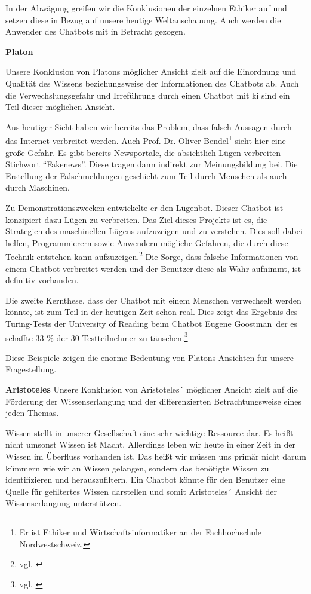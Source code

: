 In der Abwägung greifen wir die Konklusionen der einzelnen Ethiker auf und setzen diese in Bezug auf unsere heutige Weltanschauung. Auch werden die Anwender des Chatbots mit in Betracht gezogen.

\textbf{Platon}

Unsere Konklusion von Platons möglicher Ansicht zielt auf die Einordnung und Qualität des Wissens beziehungsweise der Informationen des Chatbots ab. Auch die Verwechslungsgefahr und Irreführung durch einen Chatbot mit \ac{ki} sind ein Teil dieser möglichen Ansicht.

Aus heutiger Sicht haben wir bereits das Problem, dass falsch Aussagen durch das Internet verbreitet werden. Auch Prof. Dr. Oliver Bendel\footnote{Er ist Ethiker und Wirtschaftsinformatiker an der Fachhochschule Nordwestschweiz.} sieht hier eine große Gefahr. 
Es gibt bereits Newsportale, die absichtlich Lügen verbreiten -- Stichwort \enquote{Fakenews}. 
Diese tragen dann indirekt zur Meinungsbildung bei. 
Die Erstellung der Falschmeldungen geschieht zum Teil durch Menschen als auch durch Maschinen. 

Zu Demonstrationszwecken entwickelte er den Lügenbot. Dieser Chatbot ist konzipiert dazu Lügen zu verbreiten. 
Das Ziel dieses Projekts ist es, die Strategien des maschinellen Lügens aufzuzeigen und zu verstehen. 
Dies soll dabei helfen, Programmierern sowie Anwendern mögliche Gefahren, die durch diese Technik entstehen kann aufzuzeigen.\footnote{vgl. \cite{Bendel}}  Die Sorge, dass falsche Informationen von einem Chatbot verbreitet werden und der Benutzer diese als Wahr aufnimmt, ist definitiv vorhanden.

Die zweite Kernthese, dass der Chatbot mit einem Menschen verwechselt werden könnte, ist zum Teil in der heutigen Zeit schon real.
Dies zeigt das Ergebnis des Turing-Tests der University of Reading beim Chatbot \glqq Eugene Goostman\grqq\, der es schaffte 33 \% der 30 Testteilnehmer zu täuschen.\footnote{vgl. \cite{UnivOfReading}} 

Diese Beispiele zeigen die enorme Bedeutung von Platons Ansichten für unsere Fragestellung. 

\textbf{Aristoteles}
Unsere Konklusion von Aristoteles´ möglicher Ansicht zielt auf die Förderung der Wissenserlangung und der differenzierten Betrachtungsweise eines jeden Themas.

Wissen stellt in unserer Gesellschaft eine sehr wichtige Ressource dar. Es heißt nicht umsonst \glqq Wissen ist Macht\grqq. Allerdings leben wir heute in einer Zeit in der Wissen im Überfluss vorhanden ist. Das heißt wir müssen uns primär nicht darum kümmern wie wir an Wissen gelangen, sondern das benötigte Wissen zu identifizieren und herauszufiltern.
Ein Chatbot könnte für den Benutzer eine Quelle für gefiltertes Wissen darstellen und somit Aristoteles´ Ansicht der Wissenserlangung unterstützen.

